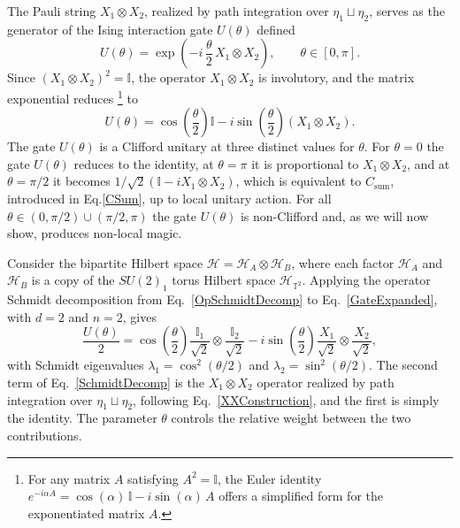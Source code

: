 \documentclass[12pt,a4paper]{article}
\begin{document}
The Pauli string $X_1\otimes X_2$, realized by path integration over $\eta_1\sqcup\eta_2$, serves as the generator of the Ising interaction gate $U(\theta)$ defined
%
\begin{equation}\label{GateDef}
U(\theta) = \exp\left(-i\,\frac{\theta}{2}\,X_1\otimes X_2\right), \qquad \theta \in [0,\pi].
\end{equation}
%
Since $(X_1\otimes X_2)^2 = \mathbb{I}$, the operator $X_1\otimes X_2$ is involutory, and the matrix exponential reduces%
%
\footnote{For any matrix $A$ satisfying $A^2 = \mathbb{I}$, the Euler identity $e^{-i\alpha A} = \cos(\alpha)\,\mathbb{I} - i\sin(\alpha)\,A$ offers a simplified form for the exponentiated matrix $A$.}%
%
 to
%
\begin{equation}\label{GateExpanded}
U(\theta) = \cos\left(\frac{\theta}{2}\right)\mathbb{I} - i\sin\left(\frac{\theta}{2}\right) \left(X_1\otimes X_2\right).
\end{equation}
%
The gate $U(\theta)$ is a Clifford unitary at three distinct values for $\theta$. For $\theta = 0$ the gate $U(\theta)$ reduces to the identity, at $\theta = \pi$ it is proportional to $X_1\otimes X_2$, and at $\theta = \pi/2$ it becomes $1/\sqrt{2}(\mathbb{I} - iX_1\otimes X_2)$, which is equivalent to $C_{\mathrm{sum}}$, introduced in Eq.\eqref{CSum}, up to local unitary action. For all $\theta\in(0,\pi/2)\cup(\pi/2,\pi)$ the gate $U(\theta)$ is non-Clifford and, as we will now show, produces non-local magic.

Consider the bipartite Hilbert space $\mathcal{H} = \mathcal{H}_A \otimes \mathcal{H}_B$, where each factor $\mathcal{H}_A$ and $\mathcal{H}_B$ is a copy of the $SU(2)_1$ torus Hilbert space $\mathcal{H}_{\mathbb{T}^2}$. Applying the operator Schmidt decomposition from Eq.\ \eqref{OpSchmidtDecomp} to Eq.\ \eqref{GateExpanded}, with $d = 2$ and $n = 2$, gives
%
\begin{equation}\label{SchmidtDecomp}
\frac{U(\theta)}{2} = \cos\left(\frac{\theta}{2}\right)\frac{\mathbb{I}_1}{\sqrt{2}}\otimes\frac{\mathbb{I}_2}{\sqrt{2}} - i\sin \left(\frac{\theta}{2}\right)\frac{X_1}{\sqrt{2}}\otimes\frac{X_2}{\sqrt{2}},
\end{equation}
%
with Schmidt eigenvalues $\lambda_1 = \cos^2(\theta/2)$ and $\lambda_2 = \sin^2(\theta/2)$. The second term of Eq.\ \eqref{SchmidtDecomp} is the $X_1 \otimes X_2$ operator realized by path integration over $\eta_1\sqcup\eta_2$, following Eq.\ \eqref{XXConstruction}, and the first is simply the identity. The parameter $\theta$ controls the relative weight between the two contributions.
\end{document}
